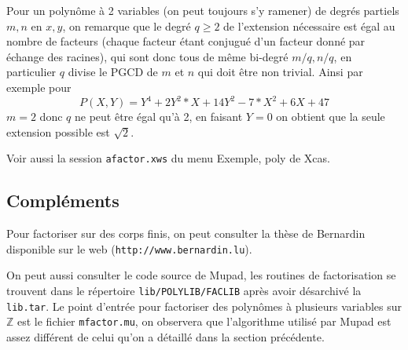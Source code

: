 \documentclass[a4paper,11pt]{article}
\newcommand{\Z}{{\mathbb{Z}}}
\begin{document}
Pour un polyn\^ome \`a 2 variables (on peut toujours s'y ramener) de
degr\'es partiels $m,n$ en $x,y$,
on remarque que le degr\'e $q \geq 2$ de l'extension n\'ecessaire est
\'egal au nombre de facteurs (chaque facteur \'etant conjugu\'e d'un
facteur donn\'e par \'echange des racines), qui sont donc tous de m\^eme
bi-degr\'e $m/q,n/q$, en particulier $q$ divise le PGCD de $m$ et $n$
qui doit \^etre non trivial. Ainsi par exemple pour 
$$ P(X,Y)=Y^4 +2Y^2*X+14Y^2 -7*X^2 +6X+47$$
$m=2$ donc $q$ ne peut \^etre \'egal qu'\`a 2, en faisant $Y=0$ on
obtient que la seule extension possible est $\sqrt{2}$.

Voir aussi la session \verb|afactor.xws| du menu Exemple, poly de Xcas.

\subsection{Compl\'ements}
Pour factoriser sur des corps finis, on peut consulter la thèse
de Bernardin disponible sur le web (\verb|http://www.bernardin.lu|).

On peut aussi consulter le code source de Mupad, les routines
de factorisation se trouvent dans le répertoire \verb|lib/POLYLIB/FACLIB|
après avoir désarchivé la \verb|lib.tar|. Le point d'entrée pour factoriser
des polynômes à plusieurs variables sur $\Z$ est le fichier 
\verb|mfactor.mu|, on observera que l'algorithme utilisé par Mupad est
assez différent de celui qu'on a détaillé dans la section précédente.

\pagebreak
\end{document}
